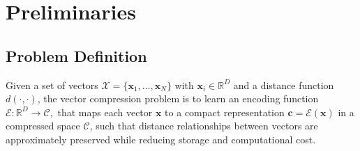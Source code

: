 \documentclass[sigconf]{acmart}
\begin{document}

\section{Preliminaries}

\subsection{Problem Definition}

\begin{definition}
Given a set of vectors $\mathcal{X} = \{ \mathbf{x}_1, \ldots, \mathbf{x}_N \}$ with
$\mathbf{x}_i \in \mathbb{R}^D$ and a distance function $d(\cdot,\cdot)$, the vector
compression problem is to learn an encoding function
\(
\mathcal{E}: \mathbb{R}^D \rightarrow \mathcal{C},
\)
that maps each vector $\mathbf{x}$ to a compact representation $\mathbf{c}=\mathcal{E}(\mathbf{x})$ in a compressed space $\mathcal{C}$, such that distance relationships between vectors are approximately preserved while reducing storage and computational cost.
\end{definition}
\end{document}
